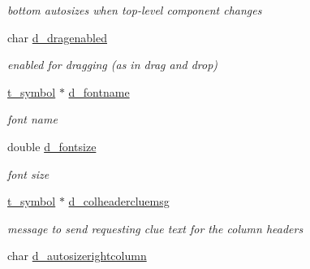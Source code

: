 \begin{DoxyCompactItemize}
\begin{DoxyCompactList}\small\item\em bottom autosizes when top-\/level component changes \item\end{DoxyCompactList}\item 
\hypertarget{structt__jdataview_a9f94615050eed3b93e623afb701177ea}{
char \hyperlink{structt__jdataview_a9f94615050eed3b93e623afb701177ea}{d\_\-dragenabled}}
\label{structt__jdataview_a9f94615050eed3b93e623afb701177ea}

\begin{DoxyCompactList}\small\item\em enabled for dragging (as in drag and drop) \item\end{DoxyCompactList}\item 
\hypertarget{structt__jdataview_aa3b66e9b33f0f14db22560bff4094066}{
\hyperlink{structt__symbol}{t\_\-symbol} $\ast$ \hyperlink{structt__jdataview_aa3b66e9b33f0f14db22560bff4094066}{d\_\-fontname}}
\label{structt__jdataview_aa3b66e9b33f0f14db22560bff4094066}

\begin{DoxyCompactList}\small\item\em font name \item\end{DoxyCompactList}\item 
\hypertarget{structt__jdataview_a2e4c73a5848bf9ef36f1c91db5f8c66d}{
double \hyperlink{structt__jdataview_a2e4c73a5848bf9ef36f1c91db5f8c66d}{d\_\-fontsize}}
\label{structt__jdataview_a2e4c73a5848bf9ef36f1c91db5f8c66d}

\begin{DoxyCompactList}\small\item\em font size \item\end{DoxyCompactList}\item 
\hypertarget{structt__jdataview_a4096d82a65d3625a0ccdcaae1b9c57be}{
\hyperlink{structt__symbol}{t\_\-symbol} $\ast$ \hyperlink{structt__jdataview_a4096d82a65d3625a0ccdcaae1b9c57be}{d\_\-colheadercluemsg}}
\label{structt__jdataview_a4096d82a65d3625a0ccdcaae1b9c57be}

\begin{DoxyCompactList}\small\item\em message to send requesting clue text for the column headers \item\end{DoxyCompactList}\item 
\hypertarget{structt__jdataview_a4a9617b49e26a05d13a14dd60726cca3}{
char \hyperlink{structt__jdataview_a4a9617b49e26a05d13a14dd60726cca3}{d\_\-autosizerightcolumn}}
\label{structt__jdataview_a4a9617b49e26a05d13a14dd60726cca3}


\end{DoxyCompactItemize}
